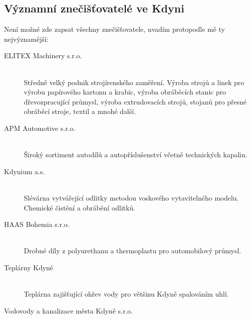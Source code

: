 \documentclass[12pt]{article} %
\begin{document}
\subsection{Významní znečišťovatelé ve Kdyni}
Není možné zde zapsat všechny znečišťovatele, uvadím protopodle mě ty nejvýznamější: 
\begin{description}
	\item[ELITEX Machinery s.r.o.] \hfill \\
	Středně velký podnik strojírenského zaměření. Výroba strojů a linek pro výrobu papírového kartonu a krabic, výroba obráběcích stanic pro dřevozpracující průmysl, výroba extrudovacích strojů, stojanů pro přesné obráběcí stroje, textil a mnohé další.
	\item[APM Automotive s.r.o.] \hfill \\
	Široký sortiment autodílů a autopříslušenství včetně technických kapalin.
	\item[Kdynium a.s.] \hfill \\
	Slévárna vytvářející odlitky metodou voskového vytavitelného modelu. Chemické čistění a obrábění odlitků.
	\item[HAAS Bohemia s.r.o.] \hfill \\
	Drobné díly z polyurethanu a thermoplastu pro automobilový průmysl.
	\item[Teplárny Kdyně] \hfill \\
	Teplárna zajišťující ohřev vody pro většinu Kdyně spalováním uhlí.
	\item[Vodovody a kanalizace města Kdyně s.r.o.]
\end{description}
\end{document}
